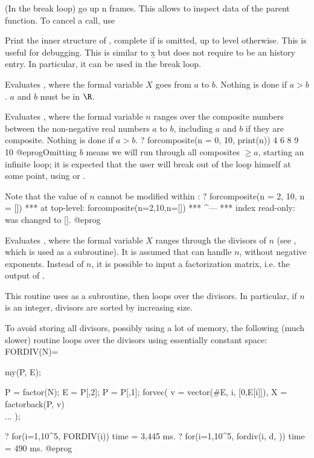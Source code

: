 \label{se:dbg_up}
(In the break loop) go up n frames. This allows to inspect data of the
parent function. To cancel a  call, use 

\label{se:dbg_x}
Print the inner structure of , complete if  is omitted, up
to level  otherwise. This is useful for debugging. This is similar to
\b{x} but does not require  to be an history entry. In particular,
it can be used in the break loop.

\label{se:for}
Evaluates , where
the formal variable $X$ goes from $a$ to $b$. Nothing is done if $a>b$.
$a$ and $b$ must be in $\R$.

\label{se:forcomposite}
Evaluates ,
where the formal variable $n$ ranges over the composite numbers between the
non-negative real numbers $a$ to $b$, including $a$ and $b$ if they are
composite. Nothing is done if $a>b$.
\bprog
? forcomposite(n = 0, 10, print(n))
4
6
8
9
10
@eprog\noindent Omitting $b$ means we will run through all composites $\geq a$,
starting an infinite loop; it is expected that the user will break out of
the loop himself at some point, using  or .

Note that the value of $n$ cannot be modified within :
\bprog
? forcomposite(n = 2, 10, n = [])
 ***   at top-level: forcomposite(n=2,10,n=[])
 ***                                      ^---
 ***   index read-only: was changed to [].
@eprog

\label{se:fordiv}
Evaluates , where
the formal variable $X$ ranges through the divisors of $n$
(see , which is used as a subroutine). It is assumed that
 can handle $n$, without negative exponents. Instead of $n$,
it is possible to input a factorization matrix, i.e. the output of
.

This routine uses  as a subroutine, then loops over the
divisors. In particular, if $n$ is an integer, divisors are sorted by
increasing size.

To avoid storing all divisors, possibly using a lot of memory, the following
(much slower) routine loops over the divisors using essentially constant
space:
\bprog
FORDIV(N)=
{ my(P, E);

  P = factor(N); E = P[,2]; P = P[,1];
  forvec( v = vector(#E, i, [0,E[i]]),
  X = factorback(P, v)
  \\ ...
);
}
? for(i=1,10^5, FORDIV(i))
time = 3,445 ms.
? for(i=1,10^5, fordiv(i, d, ))
time = 490 ms.
@eprog

